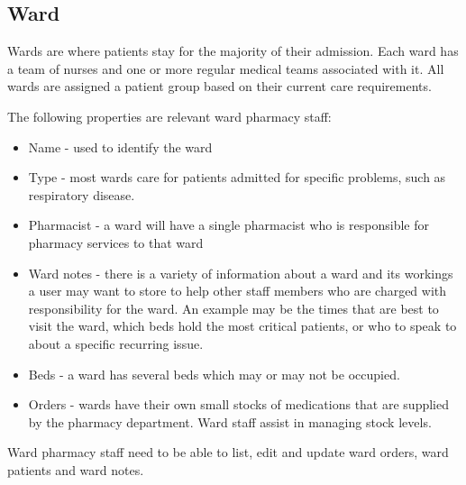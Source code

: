\documentclass[letterpaper]{amsart}
\begin{document}
\subsection{Ward}
Wards are where patients stay for the majority of their admission.  Each ward has a team of nurses and one or more regular medical teams associated with it.  All wards are assigned a patient group based on their current care requirements.

The following properties are relevant ward pharmacy staff:
\begin{itemize}
    \item Name - used to identify the ward
    \item Type - most wards care for patients admitted for specific problems, such as respiratory disease. 
    \item Pharmacist - a ward will have a single pharmacist who is responsible for pharmacy services to that ward 
    \item Ward notes - there is a variety of information about a ward and its workings a user may want to store to help other staff members who are charged with responsibility for the ward.  An example may be the times that are best to visit the ward, which beds hold the most critical patients, or who to speak to about a specific recurring issue. 
    \item Beds - a ward has several beds which may or may not be occupied. 
    \item Orders - wards have their own small stocks of medications that are supplied by the pharmacy department.  Ward staff assist in managing stock levels.
\end{itemize}
Ward pharmacy staff need to be able to list, edit and update ward orders, ward patients and ward notes. 
\end{document}
